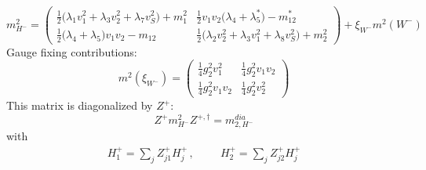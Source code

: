 \begin{itemize}
\begin{equation} 
m^2_{H^-} = \left( 
\begin{array}{cc}
\frac{1}{2} \Big(\lambda_1 v_{1}^{2}  + \lambda_3 v_{2}^{2}  + \lambda_7 v_{S}^{2} \Big) + m^2_1 &\frac{1}{2} v_1 v_2 \Big(\lambda_4 + \lambda_5^*\Big) - m_{12}^* \\ 
\frac{1}{2} \Big(\lambda_4 + \lambda_5\Big)v_1 v_2  - m_{12}  &\frac{1}{2} \Big(\lambda_2 v_{2}^{2}  + \lambda_3 v_{1}^{2}  + \lambda_8 v_{S}^{2} \Big) + m^2_2\end{array} 
\right) +  \xi_{W^-}m^2(W^-) 
 \end{equation} 
Gauge fixing contributions: 
\begin{equation} 
m^2 (\xi_{W^-}) = \left( 
\begin{array}{cc}
\frac{1}{4} g_{2}^{2} v_{1}^{2}  &\frac{1}{4} g_{2}^{2} v_1 v_2 \\ 
\frac{1}{4} g_{2}^{2} v_1 v_2  &\frac{1}{4} g_{2}^{2} v_{2}^{2} \end{array} 
\right) 
 \end{equation} 
This matrix is diagonalized by \(Z^+\): 
\begin{equation} 
Z^+ m^2_{H^-} Z^{+,\dagger} = m^{dia}_{2,H^-} 
\end{equation} 
with 
\begin{align} 
H_1^+ = \sum_{j}Z_{{j 1}}^{+}H^+_{{j}}\,, \hspace{1cm} 
H_2^+ = \sum_{j}Z_{{j 2}}^{+}H^+_{{j}}
\end{align} 
\end{itemize} 
